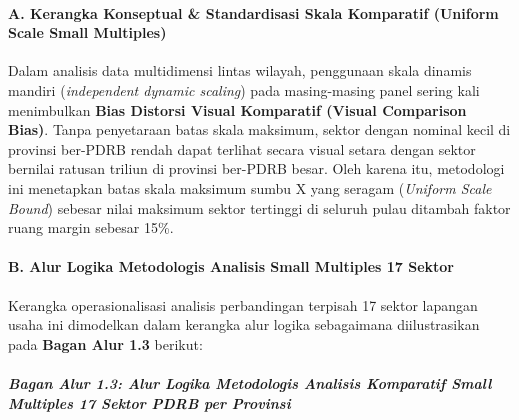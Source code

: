 \documentclass[
]{article}
\begin{document}
\paragraph{A. Kerangka Konseptual \& Standardisasi Skala Komparatif
(Uniform Scale Small
Multiples)}\label{a.-kerangka-konseptual-standardisasi-skala-komparatif-uniform-scale-small-multiples}

Dalam analisis data multidimensi lintas wilayah, penggunaan skala
dinamis mandiri (\emph{independent dynamic scaling}) pada masing-masing
panel sering kali menimbulkan \textbf{Bias Distorsi Visual Komparatif
(Visual Comparison Bias)}. Tanpa penyetaraan batas skala maksimum,
sektor dengan nominal kecil di provinsi ber-PDRB rendah dapat terlihat
secara visual setara dengan sektor bernilai ratusan triliun di provinsi
ber-PDRB besar. Oleh karena itu, metodologi ini menetapkan batas skala
maksimum sumbu X yang seragam (\emph{Uniform Scale Bound}) sebesar nilai
maksimum sektor tertinggi di seluruh pulau ditambah faktor ruang margin
sebesar 15\%.

\paragraph{B. Alur Logika Metodologis Analisis Small Multiples 17
Sektor}\label{b.-alur-logika-metodologis-analisis-small-multiples-17-sektor}

Kerangka operasionalisasi analisis perbandingan terpisah 17 sektor
lapangan usaha ini dimodelkan dalam kerangka alur logika sebagaimana
diilustrasikan pada \textbf{Bagan Alur 1.3} berikut:

\subparagraph{Bagan Alur 1.3: Alur Logika Metodologis Analisis
Komparatif Small Multiples 17 Sektor PDRB per
Provinsi}\label{bagan-alur-1.3-alur-logika-metodologis-analisis-komparatif-small-multiples-17-sektor-pdrb-per-provinsi}
\end{document}
